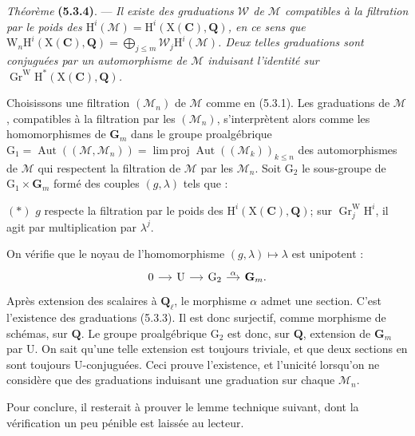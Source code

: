 \documentclass[11pt,leqno]{article}
\begin{document}
\textit{Théorème} \textbf{(5.3.4)}. — \textit{Il existe des graduations
\(\mathscr{W}\) de \(\mathscr{M}\) compatibles à la filtration par le poids
des \(\mathrm{H}^i(\mathscr{M})=\mathrm{H}^i(\mathrm{X}(\mathbf{C}),\mathbf{Q})\),
en ce sens que
\(\mathrm{W}_n\mathrm{H}^i(\mathrm{X}(\mathbf{C}),\mathbf{Q})
=\bigoplus\limits_{j\leq m}\mathscr{W}_j\mathrm{H}^i(\mathscr{M})\).
Deux telles graduations sont conjuguées par un automorphisme de
\(\mathscr{M}\) induisant l’identité sur
\(\operatorname{Gr}^{\mathrm{W}}\mathrm{H}^*(\mathrm{X}(\mathbf{C}),\mathbf{Q})\).}

Choisissons une filtration \((\mathscr{M}_n)\) de \(\mathscr{M}\) comme en
(5.3.1). Les graduations de \(\mathscr{M}\), compatibles à la filtration
par les \((\mathscr{M}_n)\), s’interprètent alors comme les homomorphismes
de \(\mathbf{G}_m\) dans le groupe proalgébrique
\(\mathrm{G}_1=\operatorname{Aut}((\mathscr{M},\mathscr{M}_n))
=\operatorname{lim\,proj}\operatorname{Aut}((\mathscr{M}_k))_{k\leq n}\)
des automorphismes de \(\mathscr{M}\) qui respectent la filtration de
\(\mathscr{M}\) par les \(\mathscr{M}_n\). Soit \(\mathrm{G}_2\) le
sous-groupe de \(\mathrm{G}_1\times\mathbf{G}_m\) formé des couples
\((g,\lambda)\) tels que :

\((*)\) \(g\) respecte la filtration par le poids des
\(\mathrm{H}^i(\mathrm{X}(\mathbf{C}),\mathbf{Q})\); sur
\(\operatorname{Gr}^{\mathrm{W}}_j\mathrm{H}^i\), il agit par
multiplication par \(\lambda^j\).

On vérifie que le noyau de l’homomorphisme
\((g,\lambda)\mapsto\lambda\) est unipotent :
\[
\begin{tikzcd}[column sep=small]
0 \arrow[r] &
\mathrm{U} \arrow[r] &
\mathrm{G}_2 \arrow[r,"\alpha"] &
\mathbf{G}_m .
\end{tikzcd}
\]
Après extension des scalaires à \(\mathbf{Q}_\ell\), le morphisme
\(\alpha\) admet une section. C’est l’existence des graduations (5.3.3).
Il est donc surjectif, comme morphisme de schémas, sur \(\mathbf{Q}\).
Le groupe proalgébrique \(\mathrm{G}_2\) est donc, sur \(\mathbf{Q}\),
extension de \(\mathbf{G}_m\) par \(\mathrm{U}\). On sait qu’une telle
extension est toujours triviale, et que deux sections en sont toujours
\(\mathrm{U}\)-conjuguées. Ceci prouve l’existence, et l’unicité lorsqu’on
ne considère que des graduations induisant une graduation sur chaque
\(\mathscr{M}_n\).

Pour conclure, il resterait à prouver le lemme technique suivant, dont
la vérification un peu pénible est laissée au lecteur.
\end{document}
